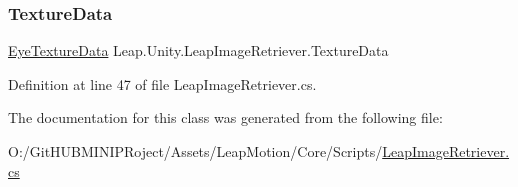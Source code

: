 \subsubsection{\texorpdfstring{TextureData}{TextureData}}
{\footnotesize\ttfamily \mbox{\hyperlink{class_leap_1_1_unity_1_1_leap_image_retriever_1_1_eye_texture_data}{Eye\+Texture\+Data}} Leap.\+Unity.\+Leap\+Image\+Retriever.\+Texture\+Data\hspace{0.3cm}{\ttfamily [get]}}



Definition at line 47 of file Leap\+Image\+Retriever.\+cs.



The documentation for this class was generated from the following file\+:\begin{DoxyCompactItemize}
\item 
O\+:/\+Git\+H\+U\+B\+M\+I\+N\+I\+P\+Roject/\+Assets/\+Leap\+Motion/\+Core/\+Scripts/\mbox{\hyperlink{_leap_image_retriever_8cs}{Leap\+Image\+Retriever.\+cs}}\end{DoxyCompactItemize}
